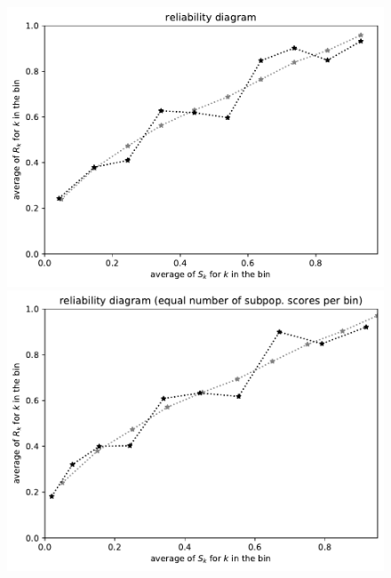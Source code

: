\documentclass{article}
\begin{document}
\begin{figure}
\begin{centering}
\parbox{\imsize}{\includegraphics[width=\imsize]
                 {./codes/unweighted/50000_3300_10_2/equiscore.pdf}}
\quad\quad
\parbox{\imsize}{\includegraphics[width=\imsize]
                 {./codes/unweighted/50000_3300_10_2/equisamps.pdf}}

\vspace{\vertsep}


\end{centering}
\end{figure}
\end{document}
